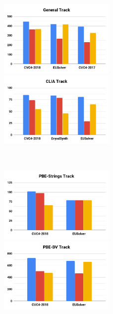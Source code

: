 \begin{figure}
	\begin{center}
		\vspace{3em}
		\begin{minipage}{\textwidth}
			\centering%
			\includegraphics[width=0.5\textwidth]{figures/TrackGeneral.png}%
			\includegraphics[width=0.5\textwidth]{figures/TrackCLIA.png}
		\end{minipage}
		\\[1cm]
		\begin{minipage}{\textwidth}
			\centering%
			\includegraphics[width=0.5\textwidth]{figures/TrackPBE-Strings.png}%
			\includegraphics[width=0.5\textwidth]{figures/TrackPBE-BV.png}
		\end{minipage}
		\\[1cm]

\end{center}
\end{figure}
